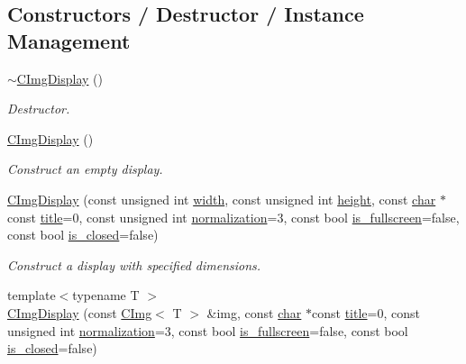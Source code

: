 \subsection*{Constructors / Destructor / Instance Management}
\begin{DoxyCompactItemize}
\item 
\hyperlink{structcimg__library__suffixed_1_1CImgDisplay_a739e8a069870cb33a40d666a05e12b5a}{$\sim$\+C\+Img\+Display} ()
\begin{DoxyCompactList}\small\item\em Destructor. \end{DoxyCompactList}\item 
\hyperlink{structcimg__library__suffixed_1_1CImgDisplay_a7716ca9a49ff94123b3417556bf4ce49}{C\+Img\+Display} ()
\begin{DoxyCompactList}\small\item\em Construct an empty display. \end{DoxyCompactList}\item 
\hyperlink{structcimg__library__suffixed_1_1CImgDisplay_a72f6d07a281eb2ddd93ae3e0adbb24db}{C\+Img\+Display} (const unsigned int \hyperlink{structcimg__library__suffixed_1_1CImgDisplay_a7b08f09ace9b615eee0ff19846c4b6f8}{width}, const unsigned int \hyperlink{structcimg__library__suffixed_1_1CImgDisplay_a5604a6886d51d1070ed2ddc568a848f2}{height}, const \hyperlink{classchar}{char} $\ast$const \hyperlink{structcimg__library__suffixed_1_1CImgDisplay_aec4c62a5a049354df77d22f6fe91e95c}{title}=0, const unsigned int \hyperlink{structcimg__library__suffixed_1_1CImgDisplay_a79b6f929fe4aaf411051fc85862191a7}{normalization}=3, const bool \hyperlink{structcimg__library__suffixed_1_1CImgDisplay_a1de2d56a94961193ef833b502120d67e}{is\+\_\+fullscreen}=false, const bool \hyperlink{structcimg__library__suffixed_1_1CImgDisplay_a6fa9d8294099dc9e1e6f67cc67e159c6}{is\+\_\+closed}=false)
\begin{DoxyCompactList}\small\item\em Construct a display with specified dimensions. \end{DoxyCompactList}\item 
{\footnotesize template$<$typename T $>$ }\\\hyperlink{structcimg__library__suffixed_1_1CImgDisplay_a6f2c4e9306456c53a3fb2428e33e9e28}{C\+Img\+Display} (const \hyperlink{structcimg__library__suffixed_1_1CImg}{C\+Img}$<$ T $>$ \&img, const \hyperlink{classchar}{char} $\ast$const \hyperlink{structcimg__library__suffixed_1_1CImgDisplay_aec4c62a5a049354df77d22f6fe91e95c}{title}=0, const unsigned int \hyperlink{structcimg__library__suffixed_1_1CImgDisplay_a79b6f929fe4aaf411051fc85862191a7}{normalization}=3, const bool \hyperlink{structcimg__library__suffixed_1_1CImgDisplay_a1de2d56a94961193ef833b502120d67e}{is\+\_\+fullscreen}=false, const bool \hyperlink{structcimg__library__suffixed_1_1CImgDisplay_a6fa9d8294099dc9e1e6f67cc67e159c6}{is\+\_\+closed}=false)

\end{DoxyCompactItemize}
